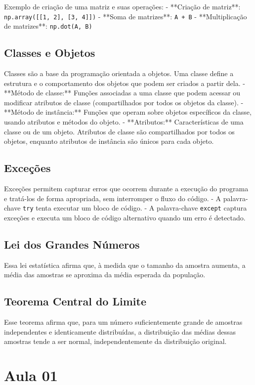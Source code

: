 \documentclass{sciposter}
\begin{document}
\begin{multicols}{3}
Exemplo de criação de uma matriz e suas operações:
- **Criação de matriz**: \texttt{np.array([[1, 2], [3, 4]])}
- **Soma de matrizes**: \texttt{A + B}
- **Multiplicação de matrizes**: \texttt{np.dot(A, B)}

\subsection{Classes e Objetos}
Classes são a base da programação orientada a objetos. Uma classe define a estrutura e o comportamento dos objetos que podem ser criados a partir dela.
- **Método de classe:** Funções associadas a uma classe que podem acessar ou modificar atributos de classe (compartilhados por todos os objetos da classe).
- **Método de instância:** Funções que operam sobre objetos específicos da classe, usando atributos e métodos do objeto.
- **Atributos:** Características de uma classe ou de um objeto. Atributos de classe são compartilhados por todos os objetos, enquanto atributos de instância são únicos para cada objeto.

\subsection{Exceções}
Exceções permitem capturar erros que ocorrem durante a execução do programa e tratá-los de forma apropriada, sem interromper o fluxo do código.
- A palavra-chave \texttt{try} tenta executar um bloco de código.
- A palavra-chave \texttt{except} captura exceções e executa um bloco de código alternativo quando um erro é detectado.

\subsection{Lei dos Grandes Números}
Essa lei estatística afirma que, à medida que o tamanho da amostra aumenta, a média das amostras se aproxima da média esperada da população.

\subsection{Teorema Central do Limite}
Esse teorema afirma que, para um número suficientemente grande de amostras independentes e identicamente distribuídas, a distribuição das médias dessas amostras tende a ser normal, independentemente da distribuição original.

\section{Aula 01}


\end{multicols}
\end{document}
